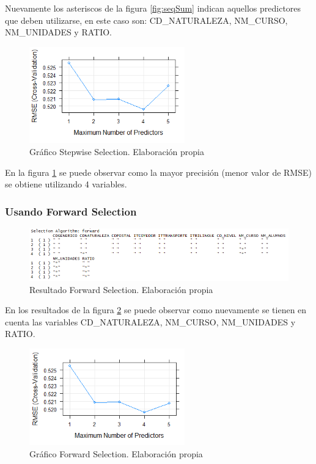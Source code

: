 \begin{subappendices}
\begin{figure}[htb]
\end{figure}
\FloatBarrier

Nuevamente los asteriscos de la figura \ref{fig:seqSum} indican aquellos predictores que deben utilizarse, en este caso son: CD\_NATURALEZA, NM\_CURSO, NM\_UNIDADES y RATIO.

\begin{figure}[htb]
	\centering
	\caption{Gráfico Stepwise Selection. Elaboración propia}
	\label{fig:seq}
	\includegraphics[width=0.6\textwidth]{recursos/ImagenesR/seq}
	
\end{figure}
\FloatBarrier

En la figura \ref{fig:seq} se puede observar como la mayor precisión (menor valor de RMSE) se obtiene utilizando 4 variables.


\subsubsection{Usando Forward Selection}
\begin{figure}[htb]
	\centering
	\caption{Resultado Forward Selection. Elaboración propia}
	\label{fig:fordwardSum}
	\includegraphics[width=1\textwidth]{recursos/ImagenesR/fordwardSum}
\end{figure}
\FloatBarrier

En los resultados de la figura \ref{fig:fordwardSum} se puede observar como nuevamente se tienen en cuenta las variables CD\_NATURALEZA, NM\_CURSO, NM\_UNIDADES y RATIO.

\begin{figure}[htb]
	\centering
	\caption{Gráfico Forward Selection. Elaboración propia}
	\label{fig:fordward}
	\includegraphics[width=0.6\textwidth]{recursos/ImagenesR/fordward}
\end{figure}
\FloatBarrier


\end{subappendices}
